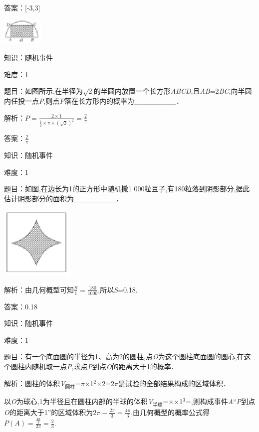 \documentclass{article} %
\begin{document}
答案：[-3,3]

\includegraphics*[width=0.77in, height=0.50in, keepaspectratio=false]{image109}

知识：随机事件

难度：1

题目：如图所示,在半径为$\sqrt{2}$的半圆内放置一个长方形\textit{ABCD},且\textit{AB}=2\textit{BC},向半圆内任投一点\textit{P},则点\textit{P}落在长方形内的概率为\_\_\_\_\_\_\_\_．

 解析：$P=\frac{2\times1}{\frac{1}{2}\times \pi \times(\sqrt{2})^2}=\frac{2}{\pi}$

答案：$\frac{2}{\pi}$

知识：随机事件

难度：1

题目：如图,在边长为1的正方形中随机撒1 000粒豆子,有180粒落到阴影部分,据此估计阴影部分的面积为\_\_\_\_\_\_\_\_．

\includegraphics*[width=1.38in, height=1.36in, keepaspectratio=false]{image110}

解析：由几何概型可知$\frac{S}{1}=\frac{180}{1000}$,所以\textit{S}=0.18.

答案：0.18

知识：随机事件

难度：1

题目：有一个底面圆的半径为1、高为2的圆柱,点\textit{O}为这个圆柱底面圆的圆心,在这个圆柱内随机取一点\textit{P},求点\textit{P}到点\textit{O}的距离大于1的概率．

解析：圆柱的体积\textit{V}${}_{\textrm{圆}\textrm{柱}}$=$\pi$$\mathrm{\times}$1${}^{2}$$\mathrm{\times}$2=2$\pi$是试验的全部结果构成的区域体积．

以\textit{O}为球心,1为半径且在圆柱内部的半球的体积\textit{V}${}_{\textrm{半}\textrm{球}}$=$\mathrm{\times}$$\mathrm{\times}$1${}^{3}$=,则构成事件\textit{A}``\textit{P}到点\textit{O}的距离大于1''的区域体积为$2\pi-\frac{2\pi}{3}=\frac{4\pi}{3}$,由几何概型的概率公式得$P(A)=\frac{\frac{4\pi}{3}}{2\pi}=\frac{2}{3}$.
\end{document}
